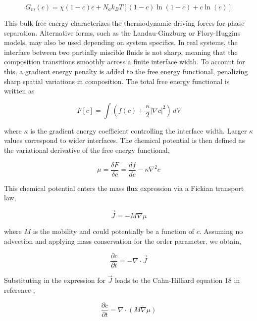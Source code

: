 \begin{equation}
    G_m (c) = \chi (1 - c)c + N_a k_B T \left[(1 - c)\ln(1 - c) + c \ln(c)\right]
\end{equation}

This bulk free energy characterizes the thermodynamic driving forces for phase separation. Alternative forms, such as the Landau-Ginzburg or Flory-Huggins models, may also be used depending on system 
specifics. In real systems, the interface between two partially miscible fluids is not sharp, meaning that the composition transitions smoothly across a finite interface width. To account for this, a 
gradient energy penalty is added to the free energy functional, penalizing sharp spatial variations in composition. The total free energy functional is written as

\begin{equation}
    F[c] = \int \left( f(c) + \frac{\kappa}{2}|\nabla c|^2 \right) \, dV
\end{equation}

where $\kappa$ is the gradient energy coefficient controlling the interface width. Larger \(\kappa\) values correspond to wider interfaces.
The chemical potential is then defined as the variational derivative of the free energy functional,

\begin{equation}
    \mu = \frac{\delta F}{\delta c} = \frac{df}{dc} - \kappa \nabla^2 c
\end{equation}

This chemical potential enters the mass flux expression via a Fickian transport law,

\begin{equation}
    \vec{J} = -M \nabla \mu
\end{equation}

where $M$ is the mobility and could potentially be a function of $c$. Assuming no advection and applying mass conservation for the order parameter, we obtain,

\begin{equation}
    \frac{\partial c}{\partial t} = -\nabla \cdot \vec{J}
\end{equation}

Substituting in the expression for \(\vec{J}\) leads to the Cahn-Hilliard equation 18 in reference \cite{cahn_spinodal_1961},

\begin{equation}
    \frac{\partial c}{\partial t} = \nabla \cdot \left( M \nabla \mu \right)
\end{equation}

